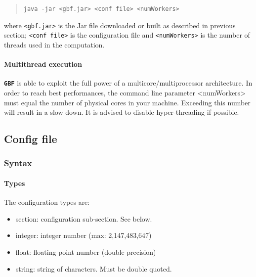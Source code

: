 \documentclass[10pt,a4paper]{article}
\begin{document}
\begin{quote}
\begin{verbatim}
java -jar <gbf.jar> <conf file> <numWorkers>
\end{verbatim}
\end{quote}

where \texttt{<gbf.jar>} is the Jar file downloaded or built as described in
previous section; \texttt{<conf file>} is the configuration file and
\texttt{<numWorkers>} is the number of threads used in the computation.

\paragraph{Multithread execution}
\label{sec-3-1}

\textbf{\texttt{\textsf{\color{namecolor}GBF}}} is able to exploit the full power of a multicore/multiprocessor
architecture. In order to reach best performances, the command line
parameter <numWorkers> must equal the number of physical cores in your
machine. Exceeding this number will result in a slow down. It is
advised to disable hyper-threading if possible.

\subsection{Config file}
\label{sec-4}

\subsubsection{Syntax}
\label{sec-4-1}

\paragraph{Types}
\label{sec-4-1-1}

The configuration types are:

\begin{itemize}
\item \textsf{\color{namecolor}section:} configuration sub-section. See below.
\item \textsf{\color{namecolor}integer:} integer number (max: 2,147,483,647)
\item \textsf{\color{namecolor}float:} floating point number (double precision)
\item \textsf{\color{namecolor}string:} string of characters. Must be double quoted.
\end{itemize}
\end{document}
